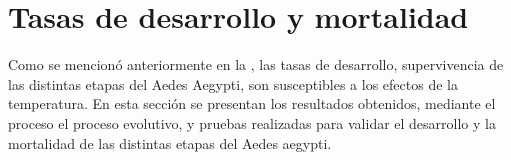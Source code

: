 \section{Tasas de desarrollo y mortalidad}
\label{sec:tasas-desarrollo-mortalidad}

Como se mencionó anteriormente en la , las tasas de desarrollo,
supervivencia de las distintas etapas del Aedes Aegypti, son susceptibles a los efectos de la
temperatura. En esta sección se presentan los resultados obtenidos, mediante el proceso el proceso
evolutivo, y pruebas realizadas para validar el desarrollo y la mortalidad de las distintas etapas
del Aedes aegypti.







